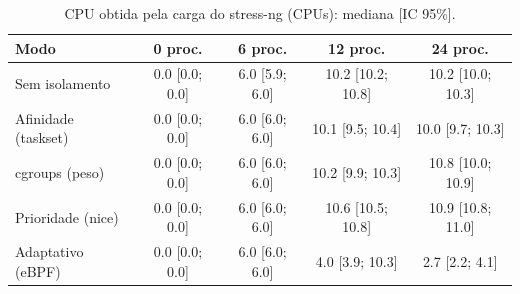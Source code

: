 \begin{table}[H]
\centering
\small
\caption{CPU obtida pela carga do stress-ng (CPUs): mediana [IC 95\%].}
\label{tab:custo}
\begin{tabular}{lcccc}
\toprule
\textbf{Modo} & \textbf{0 proc.} & \textbf{6 proc.} & \textbf{12 proc.} & \textbf{24 proc.} \\
\midrule
Sem isolamento & 0.0 [0.0; 0.0] & 6.0 [5.9; 6.0] & 10.2 [10.2; 10.8] & 10.2 [10.0; 10.3] \\
Afinidade (taskset) & 0.0 [0.0; 0.0] & 6.0 [6.0; 6.0] & 10.1 [9.5; 10.4] & 10.0 [9.7; 10.3] \\
cgroups (peso) & 0.0 [0.0; 0.0] & 6.0 [6.0; 6.0] & 10.2 [9.9; 10.3] & 10.8 [10.0; 10.9] \\
Prioridade (nice) & 0.0 [0.0; 0.0] & 6.0 [6.0; 6.0] & 10.6 [10.5; 10.8] & 10.9 [10.8; 11.0] \\
Adaptativo (eBPF) & 0.0 [0.0; 0.0] & 6.0 [6.0; 6.0] & 4.0 [3.9; 10.3] & 2.7 [2.2; 4.1] \\
\bottomrule
\end{tabular}
\end{table}
